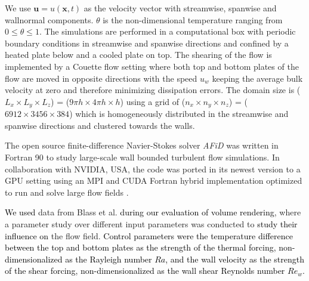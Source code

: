 \documentclass[5p,times]{elsarticle}
\begin{document}
We use $ \boldsymbol{u}=u(\boldsymbol{x},t) $ as the velocity vector with streamwise, spanwise and wallnormal components. $ \theta $ is the non-dimensional temperature ranging from $ 0 \leq \theta \leq 1 $. The simulations are performed in a computational box with periodic boundary conditions in streamwise and spanwise directions and confined by a heated plate below and a cooled plate on top. The shearing of the flow is implemented by a Couette flow setting where both top and bottom plates of the flow are moved in opposite directions with the speed $ u_w $ keeping the average bulk velocity at zero and therefore minimizing dissipation errors. The domain size is ($ L_x \times L_y \times L_z $) = ($ 9\pi h \times 4\pi h \times h $) using a grid of ($ n_x \times n_y \times n_z $) = ($ 6912 \times 3456 \times 384 $) which is homogeneously distributed in the streamwise and spanwise directions and clustered towards the walls.

The open source finite-difference Navier-Stokes solver \textit{AFiD} \cite{poe15c} was written in Fortran 90 to study large-scale wall bounded turbulent flow simulations. In collaboration with NVIDIA, USA, the code was ported in its newest version to a GPU setting using an MPI and CUDA Fortran hybrid implementation optimized to run and solve large flow fields \cite{zhu18b}.

\textcolor{black}{We used} data from Blass et al. \cite{bla19} \textcolor{black}{during our evaluation of volume rendering}, where a parameter study over different input parameters was conducted to \textcolor{black}{study their influence on} the flow field. \textcolor{black}{Control parameters were the temperature difference between the top and bottom plates as the strength of the thermal forcing, non-dimensionalized as the Rayleigh number $Ra$, and the wall velocity as the strength of the shear forcing, non-dimensionalized as the wall shear Reynolds number $Re_w$\cite{bla19}.} 


%
%
\end{document}
